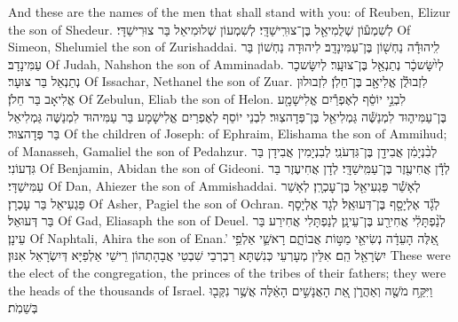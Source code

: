 {And these are the names of the men that shall stand with you: of Reuben, Elizur the son of Shedeur.}{}
{לְשִׁמְע֕וֹן שְׁלֻמִיאֵ֖ל בֶּן־צוּרִֽישַׁדָּֽי׃}
{לְשִׁמְעוֹן שְׁלוּמִיאֵל בַּר צוּרִישַׁדָּי׃}
{Of Simeon, Shelumiel the son of Zurishaddai.}{}
{לִֽיהוּדָ֕ה נַחְשׁ֖וֹן בֶּן־עַמִּינָדָֽב׃}
{לִיהוּדָה נַחְשׁוֹן בַּר עַמִּינָדָב׃}
{Of Judah, Nahshon the son of Amminadab.}{}
{לְיִ֨שָּׂשכָ֔ר נְתַנְאֵ֖ל בֶּן־צוּעָֽר׃}
{לְיִשָּׂשכָר נְתַנְאֵל בַּר צוּעָר׃}
{Of Issachar, Nethanel the son of Zuar.}{}
{לִזְבוּלֻ֕ן אֱלִיאָ֖ב בֶּן־חֵלֹֽן׃}
{לִזְבוּלוּן אֱלִיאָב בַּר חֵלֹן׃}
{Of Zebulun, Eliab the son of Helon.}{}
{לִבְנֵ֣י יוֹסֵ֔ף לְאֶפְרַ֕יִם אֱלִישָׁמָ֖ע בֶּן־עַמִּיה֑וּד לִמְנַשֶּׁ֕ה גַּמְלִיאֵ֖ל בֶּן־פְּדָהצֽוּר׃}
{לִבְנֵי יוֹסֵף לְאֶפְרַיִם אֱלִישָׁמָע בַּר עַמִּיהוּד לִמְנַשֶּׁה גַּמְלִיאֵל בַּר פְּדָהצוּר׃}
{Of the children of Joseph: of Ephraim, Elishama the son of Ammihud; of Manasseh, Gamaliel the son of Pedahzur.}{}
{לְבִ֨נְיָמִ֔ן אֲבִידָ֖ן בֶּן־גִּדְעֹנִֽי׃}
{לְבִנְיָמִין אֲבִידָן בַּר גִּדְעוֹנִי׃}
{Of Benjamin, Abidan the son of Gideoni.}{}
{לְדָ֕ן אֲחִיעֶ֖זֶר בֶּן־עַמִּֽישַׁדָּֽי׃}
{לְדָן אֲחִיעֶזֶר בַּר עַמִּישַׁדָּי׃}
{Of Dan, Ahiezer the son of Ammishaddai.}{}
{לְאָשֵׁ֕ר פַּגְעִיאֵ֖ל בֶּן־עׇכְרָֽן׃}
{לְאָשֵׁר פַּגְעִיאֵל בַּר עָכְרָן׃}
{Of Asher, Pagiel the son of Ochran.}{}
{לְגָ֕ד אֶלְיָסָ֖ף בֶּן־דְּעוּאֵֽל׃}
{לְגָד אֶלְיָסָף בַּר דְּעוּאֵל׃}
{Of Gad, Eliasaph the son of Deuel.}{}
{לְנַ֨פְתָּלִ֔י אֲחִירַ֖ע בֶּן־עֵינָֽן׃}
{לְנַפְתָּלִי אֲחִירַע בַּר עֵינָן׃}
{Of Naphtali, Ahira the son of Enan.’}{}
{אֵ֚לֶּה  הָעֵדָ֔ה נְשִׂיאֵ֖י מַטּ֣וֹת אֲבוֹתָ֑ם רָאשֵׁ֛י אַלְפֵ֥י יִשְׂרָאֵ֖ל הֵֽם׃
}
{אִלֵּין מְעָרְעֵי כְּנִשְׁתָּא רַבְרְבֵי שִׁבְטֵי אֲבָהָתְהוֹן רֵישֵׁי אַלְפַיָּא דְּיִשְׂרָאֵל אִנּוּן׃}
{These were the elect of the congregation, the princes of the tribes of their fathers; they were the heads of the thousands of Israel.}{}
{וַיִּקַּ֥ח מֹשֶׁ֖ה וְאַהֲרֹ֑ן אֵ֚ת הָאֲנָשִׁ֣ים הָאֵ֔לֶּה אֲשֶׁ֥ר נִקְּב֖וּ בְּשֵׁמֹֽת׃
}

